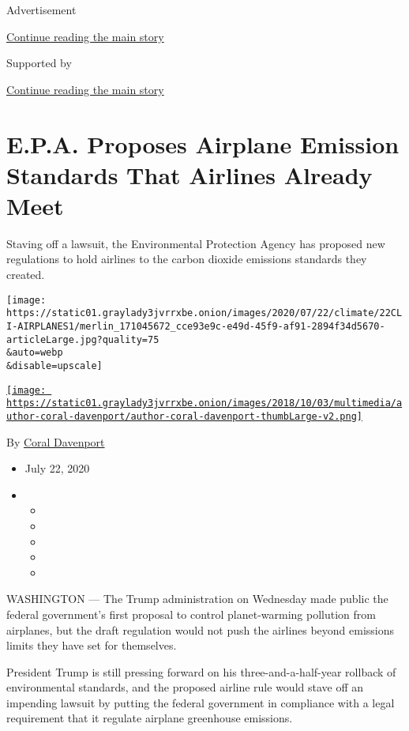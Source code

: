 Advertisement

\protect\hyperlink{after-top}{Continue reading the main story}

Supported by

\protect\hyperlink{after-sponsor}{Continue reading the main story}

\hypertarget{epa-proposes-airplane-emission-standards-that-airlines-already-meet}{%
\section{E.P.A. Proposes Airplane Emission Standards That Airlines
Already
Meet}\label{epa-proposes-airplane-emission-standards-that-airlines-already-meet}}

Staving off a lawsuit, the Environmental Protection Agency has proposed
new regulations to hold airlines to the carbon dioxide emissions
standards they created.

\texttt{[image: https://static01.graylady3jvrrxbe.onion/images/2020/07/22/climate/22CLI-AIRPLANES1/merlin\_171045672\_cce93e9c-e49d-45f9-af91-2894f34d5670-articleLarge.jpg?quality=75\\\&auto=webp\\\&disable=upscale]}

\href{https://www.nytimes3xbfgragh.onion/by/coral-davenport}{\texttt{[image: https://static01.graylady3jvrrxbe.onion/images/2018/10/03/multimedia/author-coral-davenport/author-coral-davenport-thumbLarge-v2.png]}}

By \href{https://www.nytimes3xbfgragh.onion/by/coral-davenport}{Coral
Davenport}

\begin{itemize}
\item
  July 22, 2020
\item
  \begin{itemize}
  \item
  \item
  \item
  \item
  \item
  \end{itemize}
\end{itemize}

WASHINGTON --- The Trump administration on Wednesday made public the
federal government's first proposal to control planet-warming pollution
from airplanes, but the draft regulation would not push the airlines
beyond emissions limits they have set for themselves.

President Trump is still pressing forward on his three-and-a-half-year
rollback of environmental standards, and the proposed airline rule would
stave off an impending lawsuit by putting the federal government in
compliance with a legal requirement that it regulate airplane greenhouse
emissions.

